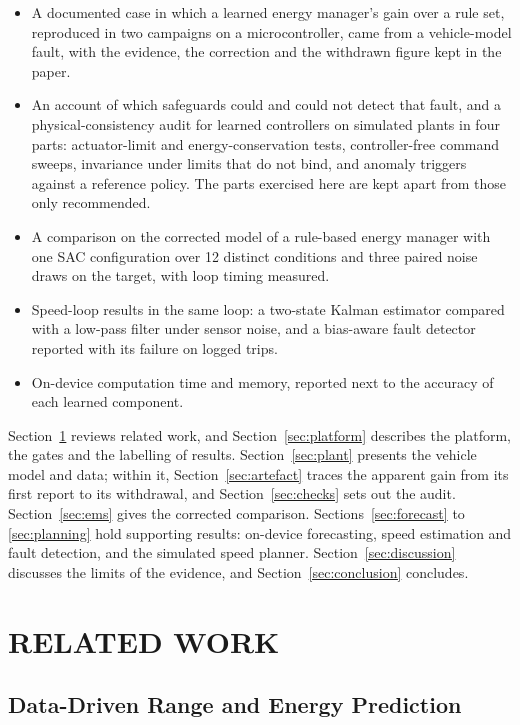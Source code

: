 \documentclass{ieeeaccess}
\begin{document}
\begin{itemize}
\item A documented case in which a learned energy manager's gain over a rule set, reproduced in two campaigns on a microcontroller, came from a vehicle-model fault, with the evidence, the correction and the withdrawn figure kept in the paper.
\item An account of which safeguards could and could not detect that fault, and a physical-consistency audit for learned controllers on simulated plants in four parts: actuator-limit and energy-conservation tests, controller-free command sweeps, invariance under limits that do not bind, and anomaly triggers against a reference policy. The parts exercised here are kept apart from those only recommended.
\item A comparison on the corrected model of a rule-based energy manager with one SAC configuration over 12 distinct conditions and three paired noise draws on the target, with loop timing measured.
\item Speed-loop results in the same loop: a two-state Kalman estimator compared with a low-pass filter under sensor noise, and a bias-aware fault detector reported with its failure on logged trips.
\item On-device computation time and memory, reported next to the accuracy of each learned component.
\end{itemize}

Section~\ref{sec:related} reviews related work, and Section~\ref{sec:platform} describes the platform, the gates and the labelling of results. Section~\ref{sec:plant} presents the vehicle model and data; within it, Section~\ref{sec:artefact} traces the apparent gain from its first report to its withdrawal, and Section~\ref{sec:checks} sets out the audit. Section~\ref{sec:ems} gives the corrected comparison. Sections~\ref{sec:forecast} to \ref{sec:planning} hold supporting results: on-device forecasting, speed estimation and fault detection, and the simulated speed planner. Section~\ref{sec:discussion} discusses the limits of the evidence, and Section~\ref{sec:conclusion} concludes.

\section{RELATED WORK}
\label{sec:related}

\subsection{Data-Driven Range and Energy Prediction}
\end{document}
